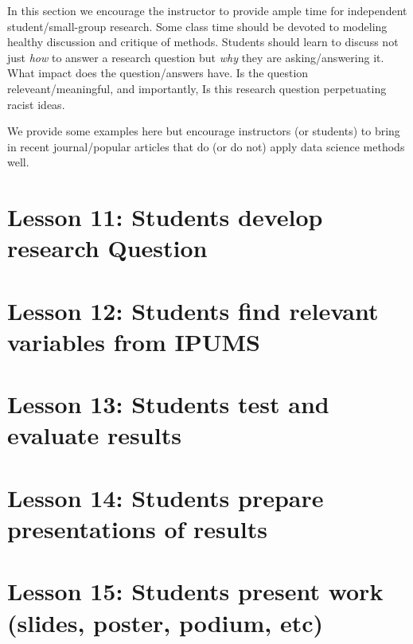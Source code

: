 \documentclass[
]{book}
\begin{document}
In this section we encourage the instructor to provide ample time for independent student/small-group research. Some class time should be devoted to modeling healthy discussion and critique of methods. Students should learn to discuss not just \emph{how} to answer a research question but \emph{why} they are asking/answering it. What impact does the question/answers have. Is the question releveant/meaningful, and importantly, Is this research question perpetuating racist ideas.

We provide some examples here but encourage instructors (or students) to bring in recent journal/popular articles that do (or do not) apply data science methods well.

\hypertarget{lesson-11-students-develop-research-question}{%
\section*{Lesson 11: Students develop research Question}\label{lesson-11-students-develop-research-question}}

\hypertarget{lesson-12-students-find-relevant-variables-from-ipums}{%
\section*{Lesson 12: Students find relevant variables from IPUMS}\label{lesson-12-students-find-relevant-variables-from-ipums}}

\hypertarget{lesson-13-students-test-and-evaluate-results}{%
\section*{Lesson 13: Students test and evaluate results}\label{lesson-13-students-test-and-evaluate-results}}

\hypertarget{lesson-14-students-prepare-presentations-of-results}{%
\section*{Lesson 14: Students prepare presentations of results}\label{lesson-14-students-prepare-presentations-of-results}}

\hypertarget{lesson-15-students-present-work-slides-poster-podium-etc}{%
\section*{Lesson 15: Students present work (slides, poster, podium, etc)}\label{lesson-15-students-present-work-slides-poster-podium-etc}}
\end{document}

